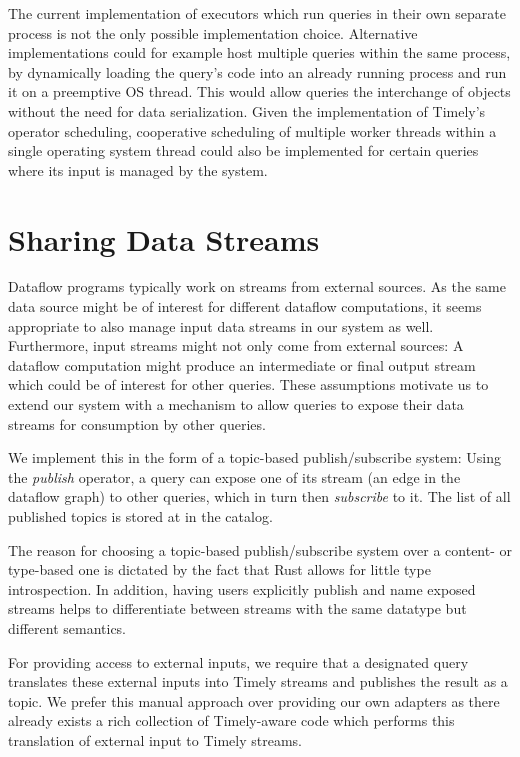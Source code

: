 The current implementation of executors which run queries in their own separate
process is not the only possible implementation choice.
Alternative implementations could for example host multiple queries
within the same process, by dynamically loading the query's code into an already
running process and run it on a preemptive OS thread. This would allow queries
the interchange of objects without the need for data serialization. Given
the implementation of Timely's operator scheduling, cooperative scheduling
of multiple worker threads within a single operating system thread could also
be implemented for certain queries where its input is managed by the system.


\section{Sharing Data Streams} \label{sec:sharingstreams}

Dataflow programs typically work on streams from external sources. As the same
data source might be of interest for different dataflow computations, it seems
appropriate to also manage input data streams in our system as well. Furthermore,
input streams might not only come from external sources: A dataflow computation
might produce an intermediate or final output stream which could be of interest
for other queries. These assumptions motivate us to extend our system with a
mechanism to allow queries to expose their data streams for consumption by other
queries.

We implement this in the form of a topic-based publish/subscribe system:
Using the \emph{publish} operator, a query can expose one of its stream
(an edge in the dataflow graph) to other queries, which in turn then \emph{subscribe}
to it. The list of all published topics is stored at in the catalog.

The reason for choosing a topic-based publish/subscribe system over a
content- or type-based one is dictated by the fact that Rust allows for little
type introspection. In addition, having users explicitly publish and name
exposed streams helps to differentiate between streams with the same datatype
but different semantics.

For providing access to external inputs, we require that a designated query
translates these external inputs into Timely streams and publishes the result as
a topic. We prefer this manual approach over providing our own adapters as there
already exists a rich collection of Timely-aware code which performs this
translation of external input to Timely streams.

